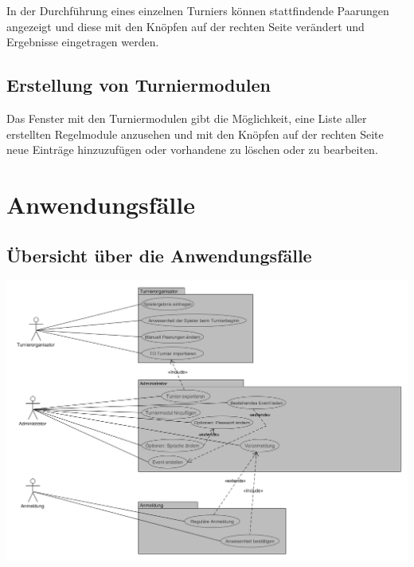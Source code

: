 \documentclass[11pt]{article}
\begin{document}
\vspace{1cm}

In der Durchführung eines einzelnen Turniers können stattfindende Paarungen angezeigt und diese mit den Knöpfen auf der rechten Seite verändert und Ergebnisse eingetragen werden.

\subsection{Erstellung von Turniermodulen}


\vspace{1cm}

Das Fenster mit den Turniermodulen gibt die Möglichkeit, eine Liste aller erstellten Regelmodule anzusehen und mit den Knöpfen auf der rechten Seite neue Einträge hinzuzufügen oder vorhandene zu löschen oder zu bearbeiten.

\section{Anwendungsfälle}

\subsection{Übersicht über die Anwendungsfälle}

\includegraphics[width=\textwidth]{UseCaseDiagram.png}
\end{document}
